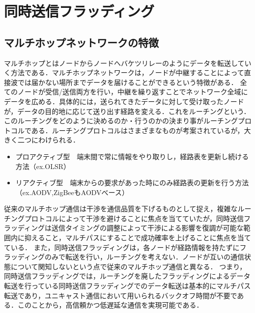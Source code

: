 \chapter{同時送信フラッディング}

\section{マルチホップネットワークの特徴}
マルチホップとはノードからノードへバケツリレーのようにデータを転送していく方法である．マルチホップネットワークは，ノードが中継することによって直接波では届かない場所までデータを届けることができるという特徴がある．
全てのノードが受信/送信両方を行い，中継を繰り返すことでネットワーク全域にデータを広める．具体的には，送られてきたデータに対して受け取ったノードが，データの目的地に応じて送り出す経路を変える．これをルーチングという．このルーチングをどのように決めるのか・行うのかの決まり事がルーチングプロトコルである．ルーチングプロトコルはさまざまなものが考案されているが，大きく二つにわけられる．

\begin{itemize}
    \item プロアクティブ型　端末間で常に情報をやり取りし，経路表を更新し続ける方法（ex.OLSR）
    \item リアクティブ型　端末からの要求があった時にのみ経路表の更新を行う方法（ex.AODV,ZigBeeもAODVべース）
\end{itemize}
従来のマルチホップ通信は干渉を通信品質を下げるものとして捉え，複雑なルーチングプロトコルによって干渉を避けることに焦点を当てていたが，同時送信フラッディングは送信タイミングの調整によって干渉による影響を復調が可能な範囲内に抑えること，マルチパスにすることで成功確率を上げることに焦点を当てている．
また，同時送信フラッディングは，各ノードが経路情報を持たずにフラッディングのみで転送を行い，ルーチングを考えない．ノードが互いの通信状態について関知しないという点で従来のマルチホップ通信と異なる．
つまり，同時送信フラッディングでは，ルーチングを廃したフラッディングによるデータ転送を行っている同時送信フラッディングでのデータ転送は基本的にマルチパス転送であり，ユニキャスト通信において用いられるバックオフ時間が不要である．このことから，高信頼かつ低遅延な通信を実現可能である．

